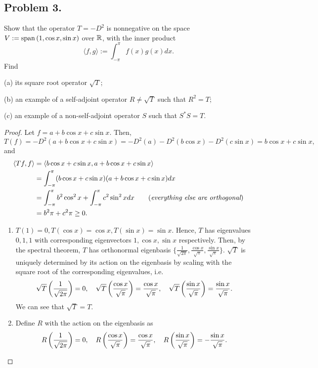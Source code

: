 \documentclass{article}
\begin{document}
\subsection*{Problem 3.}
Show that the operator $T=-D^2$ is nonnegative on the space
$V:= \mathrm{span}\, (1, \cos x, \sin x)$ over $\mathbb{R}$, with the inner product $$\langle f,g\rangle
:= \int_{-\pi}^\pi f(x) g(x) dx.$$  Find
\begin{description}
\item{(a)} its square root operator $\sqrt{T}$;
\item{(b)} an example of a self-adjoint operator $R\neq \sqrt{T}$ such that $R^2=T$;
\item{(c)} an example of a non-self-adjoint operator $S$ such that $S^*S=T$.
\end{description}
\begin{proof}
    Let $f = a + b\cos x + c\sin x$. Then,
    \[
      T(f) = -D^2(a + b\cos x + c\sin x) = -D^2(a) - D^2(b\cos x) - D^2(c\sin x) = b\cos x + c\sin x,
    \]
    and
    \begin{align*}
        \langle Tf, f\rangle & = \langle b\cos x + c\sin x, a + b\cos x + c\sin x\rangle \\
        & = \int_{-\pi}^\pi (b\cos x + c\sin x)(a + b\cos x + c\sin x) dx \\
        & = \int_{-\pi}^\pi b^2\cos^2 x + \int_{-\pi}^\pi c^2 \sin^2 xdx \qquad 
        (\emph{everything else are orthogonal}) \\
        & = b^2\pi + c^2\pi \ge 0.
    \end{align*}
    \begin{enumerate}[label=(\alph*)]
        \item $T(1)=0, T(\cos x)=\cos x, T(\sin x)=\sin x$. Hence, $T$ has eigenvalues $0,1,1$ with
            corresponding eigenvectors $1,\cos x, \sin x$ respectively. Then, by the spectral theorem,
            $T$ has orthonormal eigenbasis $\{\frac{1}{\sqrt{2\pi}},\frac{\cos x}{\sqrt{\pi}}, 
            \frac{\sin x}{\sqrt{\pi}}\}$. $\sqrt{T}$ is uniquely determined by its action on the
            eigenbasis by scaling with the square root of the corresponding eigenvalues, i.e.
            \[
                \sqrt{T}\left(\frac{1}{\sqrt{2\pi}}\right) = 0, \quad
                \sqrt{T}\left(\frac{\cos x}{\sqrt{\pi}}\right) = \frac{\cos x}{\sqrt{\pi}}, \quad
                \sqrt{T}\left(\frac{\sin x}{\sqrt{\pi}}\right) = \frac{\sin x}{\sqrt{\pi}}.
            \]
            We can see that $\sqrt{T} = T$.

            \item
            Define $R$ with the action on the eigenbasis as
            \[
                R\left(\frac{1}{\sqrt{2\pi}}\right) = 0, \quad
                R\left(\frac{\cos x}{\sqrt{\pi}}\right) = \frac{\cos x}{\sqrt{\pi}}, \quad
                R\left(\frac{\sin x}{\sqrt{\pi}}\right) = -\frac{\sin x}{\sqrt{\pi}}.
            \]


\end{enumerate}
\end{proof}
\end{document}
